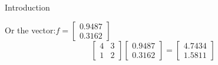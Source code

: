 \documentclass[aspectratio=169]{beamer}
\begin{document}
\begin{frame}{Introduction}

    Or the vector:\(f=\begin{bmatrix}0.9487\\0.3162\end{bmatrix}\)\pause
    \[\begin{bmatrix}4&3\\1&2\end{bmatrix}\begin{bmatrix}0.9487\\0.3162\end{bmatrix}=\begin{bmatrix}4.7434\\1.5811\end{bmatrix}\]
    
\end{frame}
\end{document}
